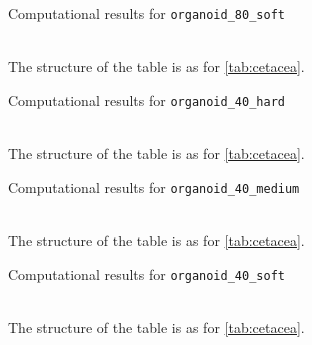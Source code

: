 \begin{landscape}
\begin{table}[p]
\centering
\caption{Computational results for \texttt{organoid\_80\_soft}}
\bigskip
{}
\label{tab:organoid_80_soft}
\\[10pt]
The structure of the table is as for \cref{tab:cetacea}.
\end{table}

\begin{table}[p]
\centering
\caption{Computational results for \texttt{organoid\_40\_hard}}
\bigskip
{}
\label{tab:organoid_40_hard}
\\[10pt]
The structure of the table is as for \cref{tab:cetacea}.
\end{table}

\begin{table}[p]
\centering
\caption{Computational results for \texttt{organoid\_40\_medium}}
\bigskip
{}
\label{tab:organoid_40_medium}
\\[10pt]
The structure of the table is as for \cref{tab:cetacea}.
\end{table}

\begin{table}[p]
\centering
\caption{Computational results for \texttt{organoid\_40\_soft}}
\bigskip
{}
\label{tab:organoid_40_soft}
\\[10pt]
The structure of the table is as for \cref{tab:cetacea}.
\end{table}

\end{landscape}

